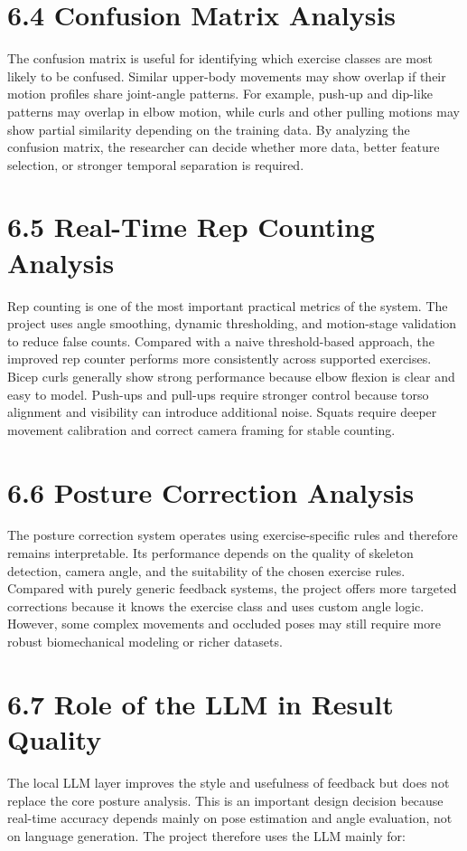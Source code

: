 \documentclass[12pt,a4paper]{report}
\begin{document}
\section{6.4 Confusion Matrix Analysis}
The confusion matrix is useful for identifying which exercise classes are most likely to be confused. Similar upper-body movements may show overlap if their motion profiles share joint-angle patterns. For example, push-up and dip-like patterns may overlap in elbow motion, while curls and other pulling motions may show partial similarity depending on the training data. By analyzing the confusion matrix, the researcher can decide whether more data, better feature selection, or stronger temporal separation is required.

\section{6.5 Real-Time Rep Counting Analysis}
Rep counting is one of the most important practical metrics of the system. The project uses angle smoothing, dynamic thresholding, and motion-stage validation to reduce false counts. Compared with a naive threshold-based approach, the improved rep counter performs more consistently across supported exercises. Bicep curls generally show strong performance because elbow flexion is clear and easy to model. Push-ups and pull-ups require stronger control because torso alignment and visibility can introduce additional noise. Squats require deeper movement calibration and correct camera framing for stable counting.

\section{6.6 Posture Correction Analysis}
The posture correction system operates using exercise-specific rules and therefore remains interpretable. Its performance depends on the quality of skeleton detection, camera angle, and the suitability of the chosen exercise rules. Compared with purely generic feedback systems, the project offers more targeted corrections because it knows the exercise class and uses custom angle logic. However, some complex movements and occluded poses may still require more robust biomechanical modeling or richer datasets.

\section{6.7 Role of the LLM in Result Quality}
The local LLM layer improves the style and usefulness of feedback but does not replace the core posture analysis. This is an important design decision because real-time accuracy depends mainly on pose estimation and angle evaluation, not on language generation. The project therefore uses the LLM mainly for:
\end{document}
